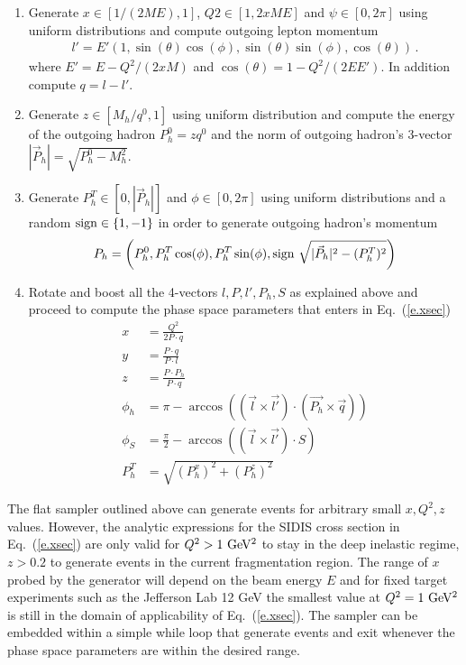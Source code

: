 \documentclass[floatfix,aps,prd,nofootinbib,superscriptaddress,preprint]{revtex4}
\newcommand\3[1]{\boldsymbol{#1}}
\newcommand{\eref}[1]{Eq.~(\ref{e.#1})}
\begin{document}
\begin{enumerate}
\item Generate $x\in[1/(2ME),1]$, $Q2\in[1,2xME]$ and 
$\psi \in [0,2\pi]$ using uniform distributions and compute 
outgoing lepton momentum
%
\begin{align}
l'=E'\left(1,\sin(\theta)\cos(\phi),\sin(\theta)\sin(\phi),\cos(\theta)\right)
\, .
\end{align}
%
where $E'=E-Q^2/(2xM)$ and $\cos(\theta)=1-Q^2/(2 E E')$.
In addition compute $q=l-l'$.
\item Generate $z\in[M_h/q^0,1]$ using uniform distribution 
and compute the energy of the outgoing hadron $P_h^0=zq^0$
and the norm of outgoing hadron's 3-vector
$|\vec{P}_h|=\sqrt{P_h^0-M_h^2}$.
\item Generate $P_{h}^T\in[0,|\vec{P}_h|]$ and $\phi\in[0,2\pi]$
using uniform distributions and a random ${\rm sign} \in\{1,-1\}$
in order to generate outgoing hadron's momentum
%
\begin{align}
P_h=\left(P_h^0,
     P_{h}^T\cos(\phi),
     P_{h}^T\sin(\phi),
     {\rm sign}~\sqrt{|\vec{P}_h|^2-(P_h^T)^2}\right)
\end{align}
\item Rotate and boost all the 4-vectors $l,P,l',P_h,S$ as explained above
and proceed to compute the phase space parameters that enters in \eref{xsec}
\begin{align}
x&=\frac{Q^2}{2P\cdot q}\\
y&=\frac{P\cdot q}{P\cdot l}\\
z&=\frac{P\cdot P_h}{P\cdot q}\\
\phi_h&=\pi-\arccos((\vec{l}\times\vec{l'})\cdot (\vec{P_h}\times\vec{q}))\\
\phi_S&=\frac{\pi}{2}-\arccos((\vec{l}\times\vec{l'})\cdot S)\\
P_h^T &=\sqrt{(P_h^x)^2+(P_h^z)^2}
\end{align}
\end{enumerate}

The flat sampler outlined above can generate events for arbitrary
small $x,Q^2,z$ values. However, the analytic expressions for the 
SIDIS cross section in \eref{xsec} are only valid for $Q^2>1{~\rm GeV^2}$
to stay in the deep inelastic regime, $z>0.2$ to generate events 
in the current fragmentation region. The range of $x$ probed by the 
generator will depend on the beam energy $E$ and for fixed target 
experiments such as the Jefferson Lab 12 GeV the smallest value 
at $Q^2=1{~\rm GeV^2}$ is still in the domain of applicability 
of \eref{xsec}. The sampler can be embedded within a simple while loop 
that generate events and exit whenever the phase space parameters 
are within the desired range. 
\end{document}
